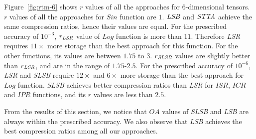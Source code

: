 \documentclass[runningheads]{llncs}
\newcommand{\hfirst}{{\it LSR}\xspace}
\newcommand{\hsecond}{{\it SLSB}\xspace}
\newcommand{\hthird}{{\it LSB}\xspace}
\newcommand{\otta}{{\it STTA}\xspace}
\begin{document}
Figure~\ref{fig:rtm-6} shows $r$ values of all the approaches for $6$-dimensional tensors. $r$ values of all the approaches for $Sin$ function are $1$. $ {\hthird}$ and $ {\otta}$ achieve the same compression ratios, hence their values are equal. For the prescribed accuracy of $10^{-3}$, $r_ {\hfirst}$ value of $Log$ function is more than $11$. Therefore \hfirst requires $11\times$ more storage than the best approach for this function. For the other functions, its values are between $1.75$ to $3$. $r_ {\hsecond}$ values are slightly better than $r_ {\hfirst}$, and are in the range of $1.75$-$2.5$. For the prescribed accuracy of $10^{-6}$, \hfirst and \hsecond require $12\times$ and $6\times$ more storage than the best approach for $Log$ function. \hsecond achieves better compression ratios than \hfirst for $ISR$, $ICR$ and $IPR$ functions, and its $r$ values are less than $2.5$.

From the results of this section, we notice that $OA$ values of \hsecond and \hthird are always within the prescribed accuracy. We also observe that \hthird achieves the best compression ratios among all our approaches. 
\end{document}
